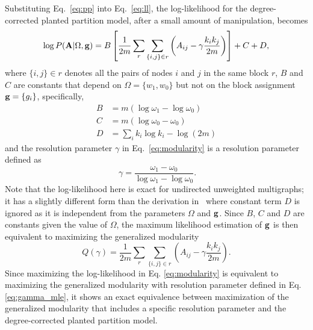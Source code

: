 Substituting Eq.~\ref{eq:pp} into Eq.~\ref{eq:ll}, the log-likelihood for the degree-corrected planted partition model, after a small amount of manipulation, becomes 
\begin{equation} \label{eq:modularity}
    \log P({\bf A}|\Omega, {\bf g}) = B \left[ \frac{1}{2m} \sum_{r} \sum_{\{i,j\} \in r} \left(A_{ij} - \gamma \frac{ k_i k_j }{ 2m } \right) \right] + C + D,
\end{equation}
where $\{i,j\} \in r$ denotes all the pairs of nodes $i$ and $j$ in the same block $r$, $B$ and $C$ are constants that depend on $\Omega=\{w_1,w_0\}$ but not on the block assignment ${\bf g} = \{g_i\}$, specifically,
\begin{equation} \label{eq:BCD}
    \begin{split}
        B&= m \left(\log \omega_1 - \log \omega_0 \right) \\
        C&= m \left(\log \omega_0 - \omega_0 \right) \\
        D&= \sum_i k_i \log k_i - \log \left(2m \right)
    \end{split}
\end{equation}
and the resolution parameter $\gamma$ in Eq.~\ref{eq:modularity} is a resolution parameter defined as
\begin{equation}~\label{eq:gamma_mle}
    \gamma = \frac{\omega_{\text{1}} - \omega_{\text{0}}}{\log \omega_{\text{1}} - \log \omega_{\text{0}}}.
\end{equation}
Note that the log-likelihood here is exact for undirected unweighted multigraphs; it has a slightly different form than the derivation in~\cite{newman2016equivalence} where constant term $D$ is ignored as it is independent from the parameters $\Omega$ and $\bf g$. Since $B$, $C$ and $D$ are constants given the value of $\Omega$, the maximum likelihood estimation of $\bf g$ is then equivalent to maximizing the generalized modularity
\begin{equation}
    Q(\gamma) = \frac{1}{2m} \sum_{r} \sum_{\{i,j\}\in r} \left( A_{ij} - \gamma \frac{ k_i k_j }{ 2m } \right).
\end{equation}
Since maximizing the log-likelihood in Eq. \ref{eq:modularity} is equivalent to maximizing the generalized modularity with resolution parameter defined in Eq. \ref{eq:gamma_mle}, it shows an exact equivalence between maximization of the generalized modularity that includes a specific resolution parameter and the degree-corrected planted partition model.


